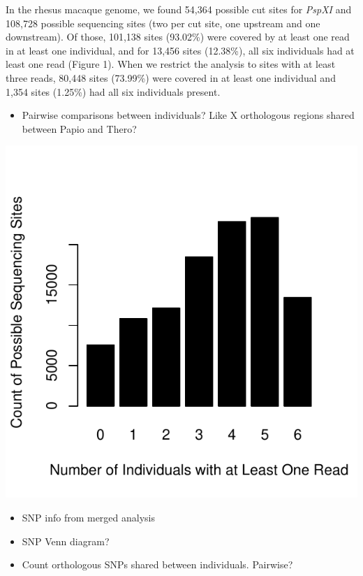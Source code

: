\documentclass[12pt]{article}
\begin{document}
In the rhesus macaque genome, we found 54,364 possible cut sites for \emph{PspXI} and 108,728 possible sequencing sites (two per cut site, one upstream and one downstream). Of those, 101,138 sites (93.02\%) were covered by at least one read in at least one individual, and for 13,456 sites (12.38\%), all six individuals had at least one read (Figure 1). When we restrict the analysis to sites with at least three reads, 80,448 sites (73.99\%) were covered in at least one individual and 1,354 sites (1.25\%) had all six individuals present.

\begin{itemize}
	\item Pairwise comparisons between individuals? Like X orthologous regions shared between Papio and Thero?
\end{itemize}

\includegraphics{figs/seq_site_coverage_by_ind}

\begin{itemize}
	\item SNP info from merged analysis
	\item SNP Venn diagram?
	\item Count orthologous SNPs shared between individuals. Pairwise?
\end{itemize}
\end{document}
